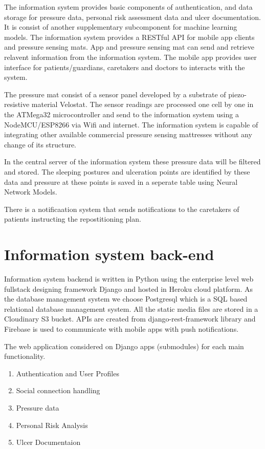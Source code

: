The information system provides basic components of authentication, and data storage for pressure data, personal risk assessment data and ulcer documentation. It is consist of another supplementary subcomponent for machine learning models. The information system provides a RESTful API for mobile app clients and pressure sensing mats. App and pressure sensing mat can send and retrieve relavent information from the information system. The mobile app provides user interface for patients/guardians, caretakers and doctors to interacts with the system.

The pressure mat consist of a sensor panel developed by a substrate of piezo-resistive material Velostat\textsuperscript{\textregistered}. The sensor readings are processed one cell by one in the ATMega32\textsuperscript{\textregistered} microcontroller and send to the information system using a NodeMCU/ESP8266\textsuperscript{\textregistered} via Wifi and internet. The information system is capable of integrating other available commercial pressure sensing mattresses without any change of its structure.

In the central server of the information system these pressure data will be filtered and stored. The sleeping postures and ulceration points are identified by these data and pressure at these points is saved in a seperate table using Neural Network Models.

There is a notificaation system that sends notifications to the caretakers of patients instructing the repostitioning plan.

\section{Information system back-end}

Information system backend is written in Python using the enterprise level web fullstack designing framework Django\textsuperscript{\textregistered} and hosted in Heroku\textsuperscript{\textregistered} cloud platform. As the database management system we choose Postgresql which is a SQL based relational database management system. All the static media files are stored in a Cloudinary S3 bucket\textsuperscript{\textregistered}. APIs are created from django-rest-framework library and Firebase\textsuperscript{\textregistered} is used to communicate with mobile apps with push notifications. 

The web application considered on Django apps (submodules) for each main functionality.
\begin{enumerate}
	\item Authentication and User Profiles
	\item Social connection handling
	\item Pressure data
	\item Personal Risk Analysis
	\item Ulcer Documentaion
\end{enumerate}

